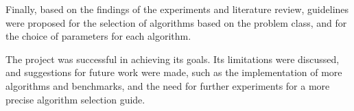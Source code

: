 Finally, based on the findings of the experiments and literature review, guidelines were proposed for the selection of algorithms based on the problem class, and for the choice of
parameters for each algorithm.

The project was successful in achieving its goals. Its limitations were discussed, and suggestions for future work were made, such as the implementation of more algorithms and benchmarks,
and the need for further experiments for a more precise algorithm selection guide.
